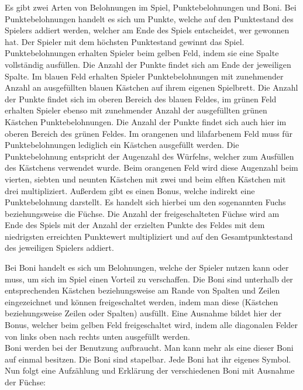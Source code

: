 Es gibt zwei Arten von Belohnungen im Spiel, Punktebelohnungen und Boni. Bei Punktebelohnungen handelt es sich um Punkte, welche auf den Punktestand des Spielers addiert werden, welcher am Ende des Spiels entscheidet, wer gewonnen hat. Der Spieler mit dem höchsten Punktestand gewinnt das Spiel. Punktebelohnungen erhalten Spieler beim gelben Feld, indem sie eine Spalte vollständig ausfüllen. Die Anzahl der Punkte findet sich am Ende der jeweiligen Spalte. Im blauen Feld erhalten Spieler Punktebelohnungen mit zunehmender Anzahl an ausgefüllten blauen Kästchen auf ihrem eigenen Spielbrett. Die Anzahl der Punkte findet sich im oberen Bereich des blauen Feldes, im grünen Feld erhalten Spieler ebenso mit zunehmender Anzahl der ausgefüllten grünen Kästchen Punktebelohnungen. Die Anzahl der Punkte findet sich auch hier im oberen Bereich des grünen Feldes. Im orangenen und lilafarbenem Feld muss für Punktebelohnungen lediglich ein Kästchen ausgefüllt werden. Die Punktebelohnung entspricht der Augenzahl des Würfelns, welcher zum Ausfüllen des Kästchens verwendet wurde. Beim orangenen Feld wird diese Augenzahl beim vierten, siebten und neunten Kästchen mit zwei und beim elften Kästchen mit drei multipliziert. Außerdem gibt es einen Bonus, welche indirekt eine Punktebelohnung darstellt. Es handelt sich hierbei um den sogenannten Fuchs beziehungsweise die Füchse. Die Anzahl der freigeschalteten Füchse wird am Ende des Spiels mit der Anzahl der erzielten Punkte des Feldes mit dem niedrigsten erreichten Punktewert multipliziert und auf den Gesamtpunktestand des jeweiligen Spielers addiert.

Bei Boni handelt es sich um Belohnungen, welche der Spieler nutzen kann oder muss, um sich im Spiel einen Vorteil zu verschaffen. Die Boni sind unterhalb der entsprechenden Kästchen beziehungsweise am Rande von Spalten und Zeilen eingezeichnet und können freigeschaltet werden, indem man diese (Kästchen beziehungsweise Zeilen oder Spalten) ausfüllt. Eine Ausnahme bildet hier der Bonus, welcher beim gelben Feld freigeschaltet wird, indem alle diagonalen Felder von links oben nach rechts unten ausgefüllt werden. \\

Boni werden bei der Benutzung aufbraucht. Man kann mehr als eine dieser Boni auf einmal besitzen. Die Boni sind stapelbar. Jede Boni hat ihr eigenes Symbol. Nun folgt eine Aufzählung und Erklärung der verschiedenen Boni mit Ausnahme der Füchse:

